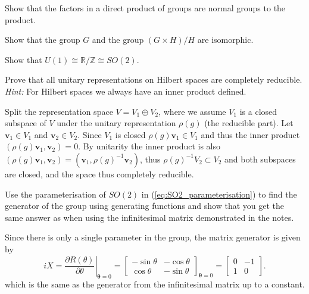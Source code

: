 \documentclass[notes.tex]{subfiles}
\begin{document}
\begin{Exercise}[]
Show that the factors in a direct product of groups are normal groups to the product.
\end{Exercise}

\begin{Exercise}[]
Show that the group $G$ and the group $(G\times H) / H$ are isomorphic.
\end{Exercise}

\begin{Exercise}[]
Show that $U(1)\cong\mathbb{R}/\mathbb{Z}\cong SO(2)$.
\end{Exercise}

\begin{Exercise}[difficulty={2}]
Prove that all unitary representations on Hilbert spaces are completely reducible. {\it Hint:} For Hilbert spaces we always have an inner product defined.
\end{Exercise}
\begin{Answer}
Split the representation space $V=V_1\oplus V_2$, where we assume $V_1$ is a closed subspace of $V$ under the unitary representation $\rho(g)$ (the reducible part). Let $\mathbf v_1\in V_1$ and $\mathbf v_2\in V_2$.  Since $V_1$ is closed $\rho(g)\mathbf v_1 \in V_1$ and thus the inner product $(\rho(g)\mathbf v_1,  \mathbf v_2)=0$.  By unitarity the inner product is also $(\rho(g)\mathbf v_1,  \mathbf v_2)=(\mathbf v_1, \rho(g)^{-1}\mathbf v_2)$, thus $\rho(g)^{-1}V_2 \subset V_2$ and both subspaces are closed, and the space thus completely reducible. 
\end{Answer}

\begin{Exercise}[difficulty={1}]
Use the parameterisation of $SO(2)$ in (\ref{eq:SO2_parameterisation}) to find the generator of the group using generating functions and show that you get the same answer as when using the infinitesimal matrix demonstrated in the notes.
\end{Exercise}
\begin{Answer}
Since there is only a single parameter in the group, the matrix generator is given by
\[
iX=\left. \frac{\partial R(\theta)}{\partial\theta }\right|_{\mathbf \theta=0} =\left[\begin{matrix} -\sin\theta &  -\cos\theta \\ \cos\theta&  -\sin\theta \end{matrix}\right]_{\mathbf \theta=0} =\left[\begin{matrix} 0&  -1 \\ 1& 0 \end{matrix}\right].
\]
which is the same as the generator from the infinitesimal matrix up to a constant.
\end{Answer}
\end{document}
